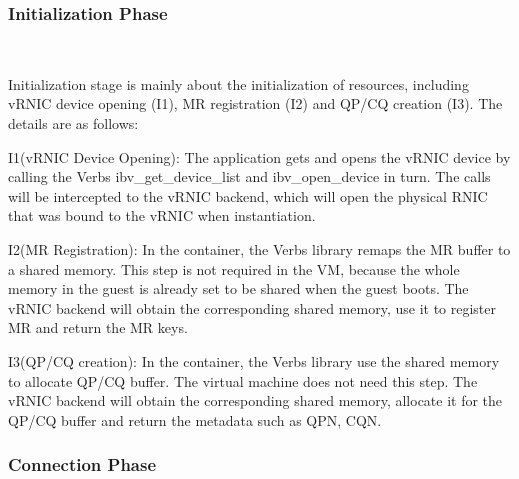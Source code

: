 \subsubsection{\textbf{Initialization Phase}}
\
\noindent

Initialization stage is mainly about the initialization of resources, including vRNIC device opening (I1), MR registration (I2) and QP/CQ creation (I3). The details are as follows:


I1(vRNIC Device Opening): The application gets and opens the vRNIC device by calling the Verbs ibv\_get\_device\_list and ibv\_open\_device in turn. The calls will be intercepted to the vRNIC backend, which will open the physical RNIC that was bound to the vRNIC when instantiation.


I2(MR Registration): In the container, the Verbs library remaps the MR buffer to a shared memory. This step is not required in the VM, because the whole memory in the guest is already set to be shared when the guest boots. The vRNIC backend will obtain the corresponding shared memory, use it to register MR and return the MR keys. 


I3(QP/CQ creation): In the container, the Verbs library use the shared memory to allocate QP/CQ buffer. The virtual machine does not need this step. The vRNIC backend will obtain the corresponding shared memory, allocate it for the QP/CQ buffer and return the metadata such as QPN, CQN.

\subsubsection{\textbf{Connection Phase}}
\
\noindent

